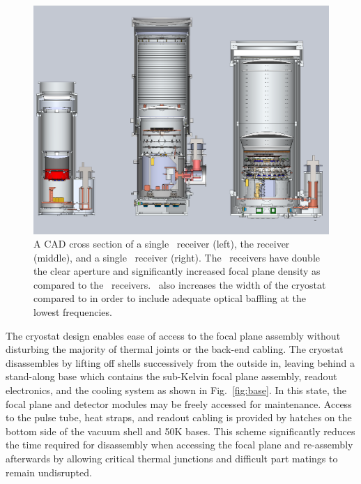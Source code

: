 \documentclass[]{spie}
\begin{document}
\begin{figure} [hb]
	\begin{center}
		\includegraphics[scale=0.35]{BA_B3_spud.PDF}
	\end{center}
	\caption{A CAD cross section of a single \keckarray\ receiver (left), the
	 receiver (middle), and a single
	\biceparray\ receiver (right). The \biceparray\ receivers have double
	the clear aperture and significantly increased focal plane density as
	compared to the \keckarray\ receivers. \biceparray\ also increases the
	width of the cryostat compared to  in order to include adequate optical baffling at the
	lowest frequencies.}
	\label{fig:bavskeck}
\end{figure}







The cryostat design enables ease of access to the focal plane assembly without
disturbing the majority of thermal joints or the back-end cabling. The
cryostat disassembles by lifting off shells successively
from the outside in, leaving behind a stand-along base which contains the
sub-Kelvin focal plane assembly, readout electronics, and the cooling system as shown in
Fig.~\ref{fig:base}. In this state, the focal plane and detector modules may be
freely accessed for maintenance. Access to the
pulse tube, heat straps, and readout cabling is provided by
hatches on the bottom side of the vacuum shell and 50K bases. This scheme
significantly reduces the time required for disassembly when accessing the
focal plane and re-assembly afterwards by allowing critical thermal junctions
and difficult part matings to remain undisrupted.
\end{document}
